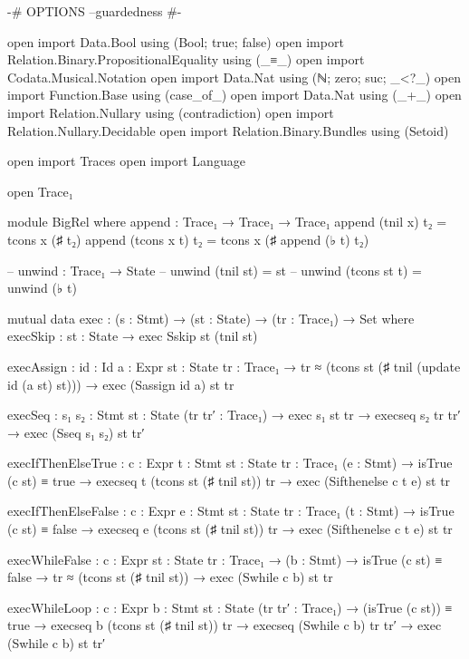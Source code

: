 {-# OPTIONS --guardedness #-}

open import Data.Bool using (Bool; true; false)
open import Relation.Binary.PropositionalEquality using (_≡_)
open import Codata.Musical.Notation
open import Data.Nat using (ℕ; zero; suc; _<?_)
open import Function.Base using (case_of_)
open import Data.Nat using (_+_)
open import Relation.Nullary using (contradiction)
open import Relation.Nullary.Decidable
open import Relation.Binary.Bundles using (Setoid)

open import Traces
open import Language

open Trace₁

module BigRel where
    append : Trace₁ → Trace₁ → Trace₁
    append (tnil x) t₂ = tcons x (♯ t₂)
    append (tcons x t) t₂ = tcons x (♯ append (♭ t) t₂)

    -- unwind : Trace₁ → State
    -- unwind (tnil st) = st
    -- unwind (tcons st t) = unwind (♭ t)

    mutual
        data exec : (s : Stmt) → (st : State) → (tr : Trace₁) → Set where
            execSkip : {st : State}
                → exec Sskip st (tnil st)

            execAssign : {id : Id} {a : Expr} {st : State} {tr : Trace₁}
                → tr ≈ (tcons st (♯ tnil (update id (a st) st)))
                → exec (Sassign id a) st tr

            execSeq : {s₁ s₂ : Stmt} {st : State} (tr tr′ : Trace₁) 
                → exec s₁ st tr 
                → execseq s₂ tr tr′ 
                → exec (Sseq s₁ s₂) st tr′

            execIfThenElseTrue : {c : Expr} {t : Stmt} {st : State} {tr : Trace₁} (e : Stmt)  
                → isTrue (c st) ≡ true 
                → execseq t (tcons st (♯ tnil st)) tr 
                → exec (Sifthenelse c t e) st tr

            execIfThenElseFalse : {c : Expr} {e : Stmt} {st : State} {tr : Trace₁} (t : Stmt) 
                → isTrue (c st) ≡ false 
                → execseq e (tcons st (♯ tnil st)) tr 
                → exec (Sifthenelse c t e) st tr

            execWhileFalse : {c : Expr} {st : State} {tr : Trace₁}
                → (b : Stmt)
                → isTrue (c st) ≡ false
                → tr ≈ (tcons st (♯ tnil st))
                → exec (Swhile c b) st tr

            execWhileLoop : {c : Expr} {b : Stmt} {st : State} (tr tr′ : Trace₁)
                → (isTrue (c st)) ≡ true 
                → execseq b (tcons st (♯ tnil st)) tr 
                → execseq (Swhile c b) tr tr′ 
                → exec (Swhile c b) st tr′

